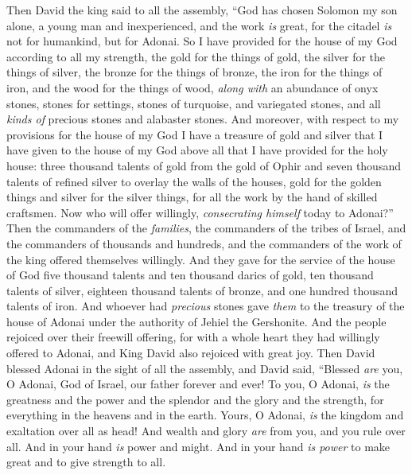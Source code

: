 \begin{biblechapter} %
 Then David the king said to all the assembly, “God has chosen Solomon my son alone, a young man and inexperienced, and the work \textit{is} great, for the citadel \textit{is} not for humankind, but for Adonai.
\verse So I have provided for the house of my God according to all my strength, the gold for the things of gold, the silver for the things of silver, the bronze for the things of bronze, the iron for the things of iron, and the wood for the things of wood, \textit{along with} an abundance of onyx stones, stones for settings, stones of turquoise, and variegated stones, and all \textit{kinds of} precious stones and alabaster stones.
\verse And moreover, with respect to my provisions for the house of my God I have a treasure of gold and silver that I have given to the house of my God above all that I have provided for the holy house:
\verse three thousand talents of gold from the gold of Ophir and seven thousand talents of refined silver to overlay the walls of the houses,
\verse gold for the golden things and silver for the silver things, for all the work by the hand of skilled craftsmen. Now who will offer willingly, \textit{consecrating himself} today to Adonai?”
\verse Then the commanders of the \textit{families}, the commanders of the tribes of Israel, and the commanders of thousands and hundreds, and the commanders of the work of the king offered themselves willingly.
\verse And they gave for the service of the house of God five thousand talents and ten thousand darics of gold, ten thousand talents of silver, eighteen thousand talents of bronze, and one hundred thousand talents of iron.
\verse And whoever had \textit{precious} stones gave \textit{them} to the treasury of the house of Adonai under the authority of Jehiel the Gershonite.
\verse And the people rejoiced over their freewill offering, for with a whole heart they had willingly offered to Adonai, and King David also rejoiced with great joy.
\verse Then David blessed Adonai in the sight of all the assembly, and David said, “Blessed \textit{are} you, O Adonai, God of Israel, our father forever and ever!
\verse To you, O Adonai, \textit{is} the greatness and the power and the splendor and the glory and the strength, for everything in the heavens and in the earth. Yours, O Adonai, \textit{is} the kingdom and exaltation over all as head!
\verse And wealth and glory \textit{are} from you, and you rule over all. And in your hand \textit{is} power and might. And in your hand \textit{is power} to make great and to give strength to all.

\end{biblechapter}
